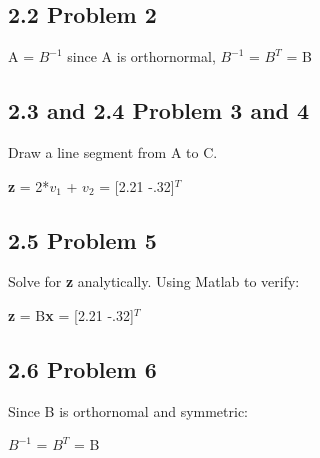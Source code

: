 \documentclass[11pt]{article}
\begin{document}
\vspace{5mm}

\subsection*{2.2 \hspace{3mm} Problem 2}
A = $B^{-1}$ since A is orthornormal, $B^{-1}$  = $B^{T}$  = B


\vspace{5mm}

\subsection*{2.3 and 2.4 \hspace{3mm} Problem 3 and 4}
Draw a line segment from A to C.

\begin{center}

\textbf{z} = 2*$v_1$ + $v_2$ = [2.21 -.32]$^{T}$

\end{center}

\vspace{5mm}

\subsection*{2.5 \hspace{3mm} Problem 5}
Solve for \textbf{z} analytically. Using Matlab to verify:

\begin{center}

\textbf{z} = B\textbf{x} = [2.21 -.32]$^{T}$



\end{center}


\vspace{5mm}

\subsection*{2.6 \hspace{3mm} Problem 6}
Since B is orthornomal and symmetric: 

\begin{center}

 $B^{-1}$  = $B^{T}$  = B



\end{center}
\end{document}
